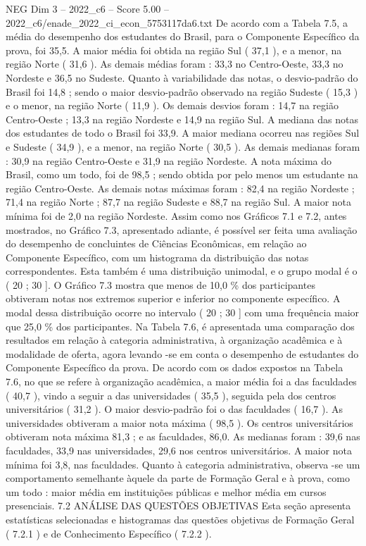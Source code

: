 \begin{textsample}{NEG Dim 3 – 2022\_c6 – Score 5.00 – 2022\_c6/enade\_2022\_ci\_econ\_5753117da6.txt}
De acordo com a Tabela 7.5, a média do desempenho dos estudantes do Brasil, para o Componente Específico da prova, foi 35,5.
A maior média foi obtida na região Sul ( 37,1 ), e a menor, na região Norte ( 31,6 ).
As demais médias foram : 33,3 no Centro-Oeste, 33,3 no Nordeste e 36,5 no Sudeste.
Quanto à variabilidade das notas, o desvio-padrão do Brasil foi 14,8 ; sendo o maior desvio-padrão observado na região Sudeste ( 15,3 ) e o menor, na região Norte ( 11,9 ).
Os demais desvios foram : 14,7 na região Centro-Oeste ; 13,3 na região Nordeste e 14,9 na região Sul.
A mediana das notas dos estudantes de todo o Brasil foi 33,9.
A maior mediana ocorreu nas regiões Sul e Sudeste ( 34,9 ), e a menor, na região Norte ( 30,5 ).
As demais medianas foram : 30,9 na região Centro-Oeste e 31,9 na região Nordeste.
A nota máxima do Brasil, como um todo, foi de 98,5 ; sendo obtida por pelo menos um estudante na região Centro-Oeste.
As demais notas máximas foram : 82,4 na região Nordeste ; 71,4 na região Norte ; 87,7 na região Sudeste e 88,7 na região Sul.
A maior nota mínima foi de 2,0 na região Nordeste.
Assim como nos Gráficos 7.1 e 7.2, antes mostrados, no Gráfico 7.3, apresentado adiante, é possível ser feita uma avaliação do desempenho de concluintes de Ciências Econômicas, em relação ao Componente Específico, com um histograma da distribuição das notas correspondentes.
Esta também é uma distribuição unimodal, e o grupo modal é o ( 20 ; 30 ].
O Gráfico 7.3 mostra que menos de 10,0 \% dos participantes obtiveram notas nos extremos superior e inferior no componente específico.
A modal dessa distribuição ocorre no intervalo ( 20 ; 30 ] com uma frequência maior que 25,0 \% dos participantes.
Na Tabela 7.6, é apresentada uma comparação dos resultados em relação à categoria administrativa, à organização acadêmica e à modalidade de oferta, agora levando -se em conta o desempenho de estudantes do Componente Específico da prova.
De acordo com os dados expostos na Tabela 7.6, no que se refere à organização acadêmica, a maior média foi a das faculdades ( 40,7 ), vindo a seguir a das universidades ( 35,5 ), seguida pela dos centros universitários ( 31,2 ).
O maior desvio-padrão foi o das faculdades ( 16,7 ).
As universidades obtiveram a maior nota máxima ( 98,5 ).
Os centros universitários obtiveram nota máxima 81,3 ; e as faculdades, 86,0.
As medianas foram : 39,6 nas faculdades, 33,9 nas universidades, 29,6 nos centros universitários.
A maior nota mínima foi 3,8, nas faculdades.
Quanto à categoria administrativa, observa -se um comportamento semelhante àquele da parte de Formação Geral e à prova, como um todo : maior média em instituições públicas e melhor média em cursos presenciais. 7.2 ANÁLISE DAS QUESTÕES OBJETIVAS Esta seção apresenta estatísticas selecionadas e histogramas das questões objetivas de Formação Geral ( 7.2.1 ) e de Conhecimento Específico ( 7.2.2 ).

\end{textsample}
